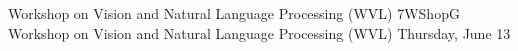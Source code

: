 \begin{wsschedule}
{Workshop on Vision and Natural Language Processing (WVL)}
{7}{WShopG}
{Workshop on Vision and Natural Language Processing (WVL)}
{Thursday, June 13}{\WShopLocG}

\end{wsschedule}
